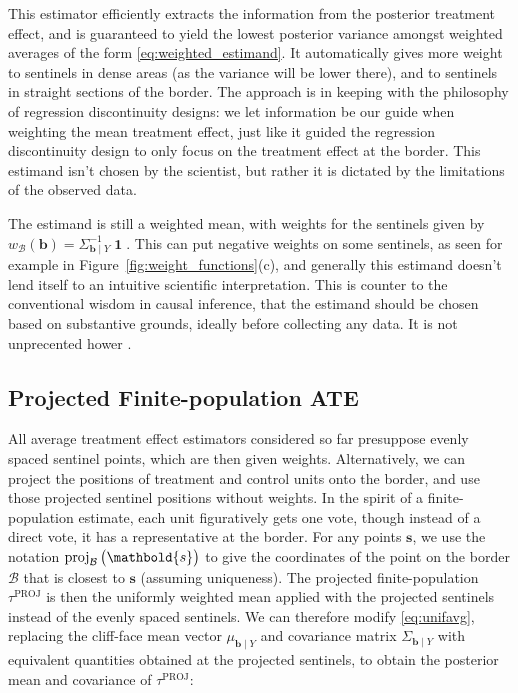 \documentclass[letter]{article}
\DeclareMathOperator{\ones}{\mathbf{1}}
\newcommand{\svec}{\mathbold{s}}
\newcommand{\boundary}{\mathcal{B}}
\newcommand{\sentinels}{\bm{b}}
\newcommand{\tauproj}{\tau^{\mathrm{PROJ}}}
\DeclareMathOperator{\proj}{proj}
\newcommand{\weightb}{w_{\boundary}}
\renewcommand{\cite}[1]{\citep{#1}}
\begin{document}
This estimator efficiently extracts the information from the posterior treatment effect, and is guaranteed to yield the lowest posterior variance amongst weighted averages of the form \eqref{eq:weighted_estimand}.
It automatically gives more weight to sentinels in dense areas (as the variance will be lower there), and to sentinels in straight sections of the border.
The approach is in keeping with the philosophy of regression discontinuity designs: we let information be our guide when weighting the mean treatment effect, just like it guided the regression discontinuity design to only focus on the treatment effect at the border.
This estimand isn't chosen by the scientist, but rather it is dictated by the limitations of the observed data.

The estimand is still a weighted mean, with weights for the sentinels given by \(\weightb(\sentinels) = \Sigma_{\sentinels \mid Y}^{-1} \ones\).
This can put negative weights on some sentinels, as seen for example in Figure~\ref{fig:weight_functions}(c), and generally this estimand doesn't lend itself to an intuitive scientific interpretation.
This is counter to the conventional wisdom in causal inference, that the estimand should be chosen based on substantive grounds, ideally before collecting any data.
It is not unprecented hower \cite{li2016balancing}.
    


    	\subsection{Projected Finite-population ATE}\label{projected-finite-population-ate}

All average treatment effect estimators considered so far presuppose evenly spaced sentinel points, which are then given weights.
Alternatively, we can project the positions of treatment and control units onto the border, and use those projected sentinel positions without weights.
In the spirit of a finite-population estimate, each unit figuratively gets one vote, though instead of a direct vote, it has a representative at the border.
For any points \(\svec\), we use the notation \(\proj_{\boundary}\del{\svec}\) to give the coordinates of the point on the border \(\boundary\) that is closest to \(\svec\) (assuming uniqueness).
The projected finite-population \(\tauproj\) is then the uniformly weighted mean applied with the projected sentinels instead of the evenly spaced sentinels.
We can therefore modify \eqref{eq:unifavg}, replacing the cliff-face mean vector \(\mu_{\sentinels \mid Y}\)
and covariance matrix \(\Sigma_{\sentinels \mid Y}\)
with equivalent quantities obtained at the projected sentinels,
to obtain the posterior mean and covariance of \(\tauproj\):
\end{document}
